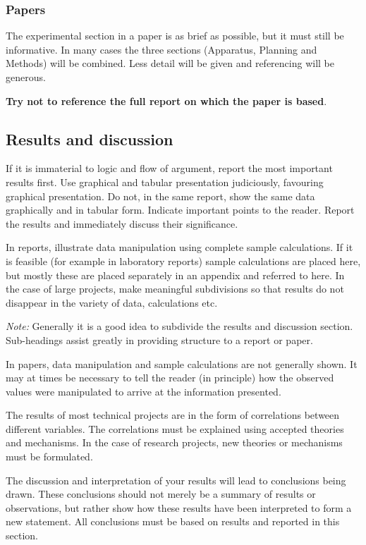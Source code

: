 \documentclass[a5paper, 10pt]{article}
\begin{document}
\subsubsection{Papers}
The experimental section in a paper is as brief as possible, but it
must still be informative.  In many cases the three sections
(Apparatus, Planning and Methods) will be combined.  
Less detail will be given and referencing will be generous.

\textbf{Try not to reference the full report on which the paper is based}.

\subsection{Results and discussion}
\label{sec:results-and-discussion}
If it is immaterial to logic and flow of argument, report the most
important results first.  Use graphical and tabular presentation
judiciously, favouring graphical presentation.  Do not, in the same
report, show the same data graphically and in tabular form.  Indicate
important points to the reader.  
Report the results and immediately discuss their significance.

In reports, illustrate data manipulation using complete sample
calculations.  If it is feasible (for example in laboratory reports)
sample calculations are placed here, but mostly these are placed
separately in an appendix and referred to here.  In the case of large
projects, make meaningful subdivisions so that results do not
disappear in the variety of data, calculations etc.

\emph{Note:} Generally it is a good idea to subdivide the results and discussion section.
Sub-headings assist greatly in providing structure to a report or paper.

In papers, data manipulation and sample calculations are not generally
shown.  It may at times be necessary to tell the reader (in principle)
how the observed values were manipulated to arrive at the information
presented.

The results of most technical projects are in the form of correlations
between different variables.  The correlations must be explained using
accepted theories and mechanisms.  In the case of research projects,
new theories or mechanisms must be formulated.

The discussion and interpretation of your results will lead to
conclusions being drawn.  These conclusions should not merely be a
summary of results or observations, but rather show how these results
have been interpreted to form a new statement.
All conclusions must be based on results and reported in this section.
\end{document}
